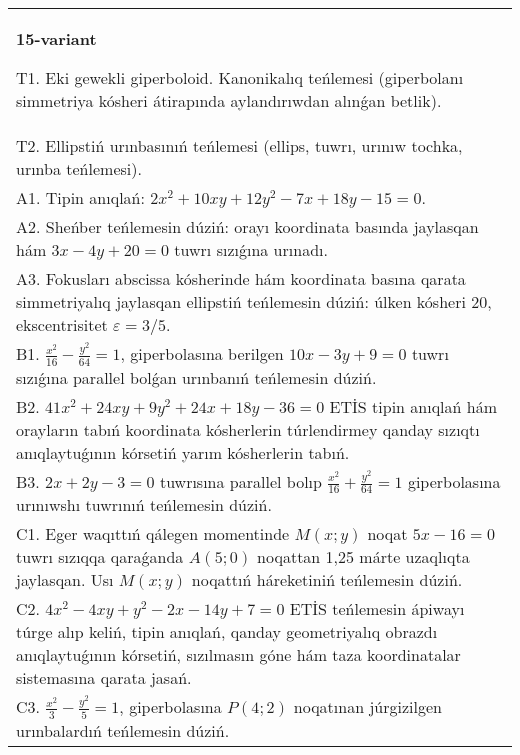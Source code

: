 \documentclass{article}
\begin{document}
\begin{tabular}{m{17cm}}
\textbf{15-variant}
\newline

T1. Eki gewekli giperboloid. Kanonikalıq teńlemesi (giperbolanı simmetriya kósheri átirapında aylandırıwdan alınǵan betlik).\\

T2. Ellipstiń urınbasınıń teńlemesi (ellips, tuwrı, urınıw tochka, urınba teńlemesi).\\

A1. Tipin anıqlań: $2 x^{2}+10 xy+12 y^{2}-7 x+18 y-15=0$.\\

A2. Sheńber teńlemesin dúziń: orayı koordinata basında jaylasqan hám $3 x-4 y+20=0$ tuwrı sızıǵına urınadı.\\

A3. Fokusları abscissa kósherinde hám koordinata basına qarata simmetriyalıq jaylasqan ellipstiń teńlemesin dúziń: úlken kósheri $20$, ekscentrisitet $\varepsilon=3/5$.\\

B1. $\frac{x^{2}}{16} - \frac{y^{2}}{64} = 1$, giperbolasına berilgen $10x - 3y + 9 = 0$ tuwrı sızıǵına parallel bolǵan urınbanıń teńlemesin dúziń.  \\

B2. $41x^{2} + 24xy + 9y^{2} + 24x + 18y - 36 = 0$ ETİS tipin anıqlań hám orayların tabıń koordinata kósherlerin túrlendirmey qanday sızıqtı anıqlaytuǵının kórsetiń yarım kósherlerin tabıń.  \\

B3. $2x + 2y - 3 = 0$ tuwrısına parallel bolıp $\frac{x^{2}}{16} + \frac{y^{2}}{64} = 1$ giperbolasına urınıwshı tuwrınıń teńlemesin dúziń.  \\

C1. Eger waqıttıń qálegen momentinde $M(x;y)$ noqat $5x - 16 = 0$ tuwrı sızıqqa qaraǵanda $A(5;0)$ noqattan 1,25 márte uzaqlıqta jaylasqan. Usı $M(x;y)$ noqattıń háreketiniń teńlemesin dúziń.  \\

C2. $4x^{2} - 4xy + y^{2} - 2x - 14y + 7 = 0$ ETİS teńlemesin ápiwayı túrge alıp keliń, tipin anıqlań, qanday geometriyalıq obrazdı anıqlaytuǵının kórsetiń, sızılmasın góne hám taza koordinatalar sistemasına qarata jasań.  \\

C3. $\frac{x^{2}}{3} - \frac{y^{2}}{5} = 1$, giperbolasına $P(4;2)$ noqatınan júrgizilgen urınbalardıń teńlemesin dúziń.  \\

\end{tabular}
\vspace{1cm}
\end{document}
